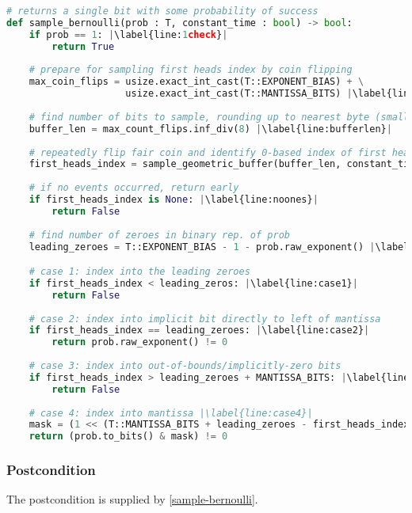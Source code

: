 \documentclass{article}
\begin{document}
\begin{lstlisting}[language=Python, escapechar=|]
# returns a single bit with some probability of success
def sample_bernoulli(prob : T, constant_time : bool) -> bool:
    if prob == 1: |\label{line:1check}|
        return True
        
    # prepare for sampling first heads index by coin flipping
    max_coin_flips = usize.exact_int_cast(T::EXPONENT_BIAS) + \
                     usize.exact_int_cast(T::MANTISSA_BITS) |\label{line:maxcoinflips}|
    
    # find number of bits to sample, rounding up to nearest byte (smallest sample size)
    buffer_len = max_count_flips.inf_div(8) |\label{line:bufferlen}|
    
    # repeatedly flip fair coin and identify 0-based index of first heads
    first_heads_index = sample_geometric_buffer(buffer_len, constant_time) |\label{line:sampling}|
    
    # if no events occurred, return early
    if first_heads_index is None: |\label{line:noones}|
        return False
    
    # find number of zeroes in binary rep. of prob
    leading_zeroes = T::EXPONENT_BIAS - 1 - prob.raw_exponent() |\label{line:leadingzeroes}|

    # case 1: index into the leading zeroes
    if first_heads_index < leading_zeros: |\label{line:case1}|
        return False
    
    # case 2: index into implicit bit directly to left of mantissa
    if first_heads_index == leading_zeroes: |\label{line:case2}|
        return prob.raw_exponent() != 0
    
    # case 3: index into out-of-bounds/implicitly-zero bits
    if first_heads_index > leading_zeroes + MANTISSA_BITS: |\label{line:case3}|
        return False
    
    # case 4: index into mantissa |\label{line:case4}|
    mask = (1 << (T::MANTISSA_BITS + leading_zeroes - first_heads_index))
    return (prob.to_bits() & mask) != 0
\end{lstlisting}

\subsubsection*{Postcondition}
The postcondition is supplied by \ref{sample-bernoulli}.
\end{document}
